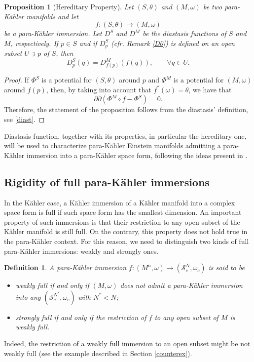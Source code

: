 \documentclass{article}
\newtheorem{df}[thm]{Definition}
\newtheorem{prop}[thm]{Proposition}
\newcommand{\de}{\partial}
\newcommand{\s}{\mathcal{S}}
\newcommand{\pk}{para-K\"ahler }
\begin{document}
\begin{prop}[Hereditary Property]\label{her}
Let $(S,\theta)$  and $(M,\omega)$ be two \pk manifolds and  let 
$$f: (S,\theta)\to(M,\omega)$$ be a \pk immersion. Let $D^S$ and $D^M$ be  the diastasis functions of $S$ and $M$, respectively. 
If $p\in S$  and if $D^S_p$ (cfr. Remark \ref{D0}) is defined on an open subset $U\ni p$ of $S$, then
$$D^S_p(q)=D^M_{f(p)}\left(f(q)\right),\qquad \forall q\in U.$$
\end{prop}
\begin{proof}
If $\Phi^S$ is a potential for $(S,\theta)$ around $p$ and $\Phi^M$ is a potential for $(M,\omega)$ around $f(p)$, then, by taking into account that $f^*(\omega)=\theta$, we have that
$$\de\bar\de\left( \Phi^M\circ f-\Phi^S\right)=0.$$
Therefore, the statement of the proposition follows from the diastasis' definition, see \eqref{diast}.
\end{proof}
%
Diastasis function, together with its properties, in particular the hereditary one, will be used to characterize \pk Einstein manifolds admitting a \pk immersion into a \pk space form, following the ideas present in \cite{ms1,ms2}.


\subsection{Rigidity of full \pk immersions}\label{rig}

In the  K\"ahler case, a K\"ahler  immersion of a K\"ahler manifold into a complex space form is full if such space form has the smallest dimension. An important property of such immersions is that their restriction to any open subset of the K\"ahler  manifold is still full.
On the contrary, this property does not hold true in the \pk context. For this reason, we need to distinguish two kinds of full \pk immersions: weakly and strongly ones.
\begin{df}
A \pk immersion  $f:(M^n,\omega)\to (\s_c^N,\omega_c)$ is said to be 
\begin{itemize}
\item \emph{weakly full} if and only if $(M,\omega)$ does not admit a \pk immersion into any $ (\s_c^{N^*},\omega_c)$ with $N^*<N$;
\item \emph{strongly full} if and only if
the restriction of $f$ to any open subset of $M$ is weakly full.\end{itemize}
\end{df}
Indeed,  the restriction of  a weakly full immersion to an open subset might be not weakly full (see the example described in Section \ref{counterex}).
\end{document}
